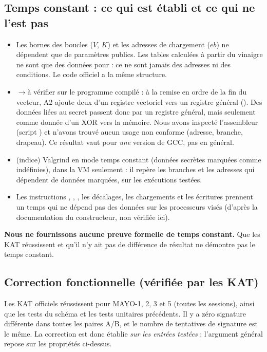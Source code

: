\subsection{Temps constant : ce qui est établi et ce qui ne l'est pas}\label{sec:tempsconst}
\begin{itemize}
\item \Pc{} Les bornes des boucles ($V$, $K$) et les adresses de chargement ($eb$) ne dépendent que de paramètres publics. Les tables calculées à partir du vinaigre ne sont que des données pour \vpshufb{} : ce ne sont jamais des adresses ni des conditions. Le code officiel a la même structure.
\item \Pc{}$\to$à vérifier sur le programme compilé : à la remise en ordre de la fin du vecteur, A2 ajoute deux  d'un registre vectoriel vers un registre général (). Des données liées au secret passent donc par un registre général, mais seulement comme donnée d'un XOR vers la mémoire. Nous avons inspecté l'assembleur (script ) et n'avons trouvé aucun usage non conforme (adresse, branche, drapeau). Ce résultat vaut pour \emph{une} version de GCC, pas en général.
\item \Pe{} (indice) Valgrind en mode temps constant (données secrètes marquées comme indéfinies), dans la VM seulement : il repère les branches et les adresses qui dépendent de données marquées, sur les exécutions testées.
\item \Hy{} Les instructions \vpshufb{}, , , les décalages, les chargements et les écritures prennent un temps qui ne dépend pas des données sur les processeurs visés (d'après la documentation du constructeur, non vérifiée ici).
\end{itemize}
\textbf{Nous ne fournissons aucune preuve formelle de temps constant.} Que les KAT réussissent et qu'il n'y ait pas de différence de résultat ne démontre pas le temps constant.

\subsection{Correction fonctionnelle (vérifiée par les KAT)}
Les KAT officiels réussissent pour MAYO-1, 2, 3 et 5 (toutes les sessions), ainsi que les tests du schéma et les tests unitaires précédents. Il y a zéro signature différente dans toutes les paires A/B, et le nombre de tentatives de signature est le même. La correction est donc établie \emph{sur les entrées testées} ; l'argument général repose sur les propriétés \Pc{} ci-dessus.

